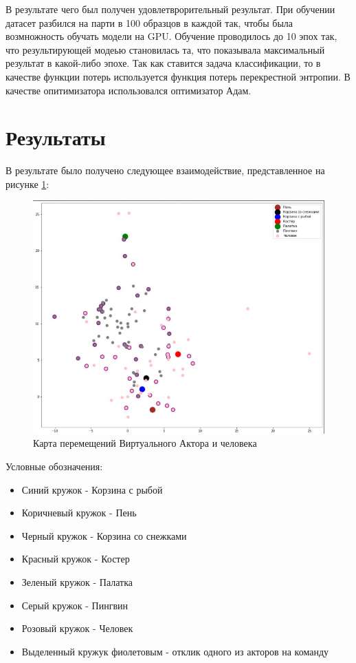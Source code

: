 В результате чего был получен удовлетврорительный результат.
При обучении датасет разбился на парти в 100 образцов в каждой так, чтобы была возмножность
обучать модели на GPU. Обучение проводилось до 10 эпох так, что результирующей модеью становилась та,
что показывала максимальный результат в какой-либо эпохе.
Так как ставится задача классификации, то в качестве функции потерь используется функция потерь перекрестной энтропии.
В качестве опитимизатора использовался оптимизатор Адам.


\section{Результаты}

В результате было получено следующее взаимодействие, представленное на рисунке \ref{pic:res_actions_plus_voice_actions}:

\begin{figure}[h]
\includegraphics[width=0.75\columnwidth]{./img/res_actions_plus_voice_actions.jpg}
\centering
\caption{Карта перемещений Виртуального Актора и человека}
\label{pic:res_actions_plus_voice_actions}
\end{figure}

Условные обозначения: 

\begin{itemize}
  \item Синий кружок - Корзина с рыбой
  \item Коричневый кружок - Пень
  \item Черный кружок - Корзина со снежками
  \item Красный кружок - Костер
  \item Зеленый кружок - Палатка
  \item Серый кружок - Пингвин
  \item Розовый кружок - Человек
  \item Выделенный кружук фиолетовым - отклик одного из акторов на команду
\end{itemize}


